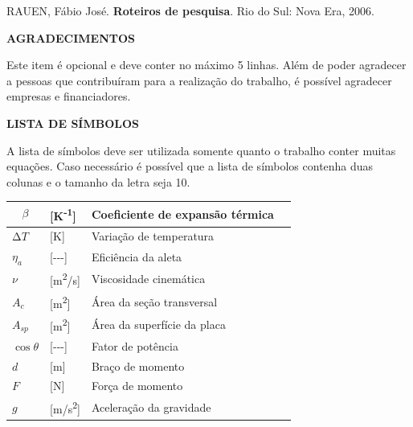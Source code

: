 \documentclass[
]{article}
\begin{document}
RAUEN, Fábio José. \textbf{Roteiros de pesquisa}. Rio do Sul: Nova Era,
2006.

\textbf{AGRADECIMENTOS}

Este item é opcional e deve conter no máximo 5 linhas. Além de poder
agradecer a pessoas que contribuíram para a realização do trabalho, é
possível agradecer empresas e financiadores.

\textbf{LISTA DE SÍMBOLOS}

A lista de símbolos deve ser utilizada somente quanto o trabalho conter
muitas equações. Caso necessário é possível que a lista de símbolos
contenha duas colunas e o tamanho da letra seja 10.

\begin{longtable}[]{@{}
  >{\raggedright\arraybackslash}p{}
  >{\raggedright\arraybackslash}p{}
  >{\raggedright\arraybackslash}p{}
  >{\raggedright\arraybackslash}p{}@{}}
\toprule\noalign{}
\begin{minipage}[b]{\linewidth}\raggedright
\[\beta\]
\end{minipage} & \begin{minipage}[b]{\linewidth}\raggedright
{[}K\textsuperscript{-1}{]}
\end{minipage} & \begin{minipage}[b]{\linewidth}\raggedright
Coeficiente de expansão térmica
\end{minipage} & \begin{minipage}[b]{\linewidth}\raggedright
\end{minipage} \\
\midrule\noalign{}
\endhead
\bottomrule\noalign{}
\endlastfoot
\(\mathrm{\Delta}T\) & {[}K{]} & Variação de temperatura & \\
\(\eta_{a}\) & {[}-\/-\/-{]} & Eficiência da aleta & \\
\(\nu\) & {[}m\textsuperscript{2}/s{]} & Viscosidade cinemática & \\
\(A_{c}\) & {[}m\textsuperscript{2}{]} & Área da seção transversal & \\
\(A_{sp}\) & {[}m\textsuperscript{2}{]} & Área da superfície da placa
& \\
\(\cos\theta\) & {[}-\/-\/-{]} & Fator de potência & \\
\(d\) & {[}m{]} & Braço de momento & \\
\(F\) & {[}N{]} & Força de momento & \\
\(g\) & {[}m/s\textsuperscript{2}{]} & Aceleração da gravidade & \\
\end{longtable}
\end{document}
